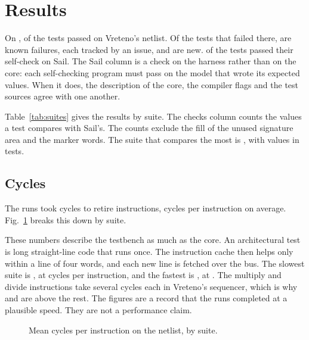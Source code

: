 \section{Results}
\label{sec:results}

On \ReportDate, \NRtlPass{} of the \NTests{} tests passed on Vreteno's
netlist. Of the tests that failed there, \NKnownFail{} are known
failures, each tracked by an issue, and \NUnknownFail{} are new.
\NSailPass{} of the \NTests{} tests passed their self-check on Sail. The
Sail column is a check on the harness rather than on the core: each
self-checking program must pass on the model that wrote its expected
values. When it does, the description of the core, the compiler flags
and the test sources agree with one another.

Table~\ref{tab:suites} gives the results by suite. The checks column
counts the values a test compares with Sail's. The counts exclude the
fill of the unused signature area and the marker words. The suite that
compares the most is \code{\MostChecksSuite}, with \MostChecks{}
values in \MostChecksTests{} tests.

\begin{table}[t]
\centering
\caption{Results by suite}
\label{tab:suites}
\scriptsize

\end{table}

\subsection{Cycles}

The \NTests{} runs took \TotalCycles{} cycles to retire \TotalInstr{}
instructions, \MeanCPI{} cycles per instruction on average.
Fig.~\ref{fig:cpi} breaks this down by suite.

These numbers describe the testbench as much as the core. An
architectural test is long straight-line code that runs once. The
instruction cache then helps only within a line of four words, and
each new line is fetched over the bus. The slowest suite is \code{\SlowSuite}, at \SlowCPI{} cycles
per instruction, and the fastest is \code{\FastSuite}, at \FastCPI.
The multiply and divide instructions take several cycles each in
Vreteno's sequencer, which is why  and  are above
the rest. The figures are a record that the runs completed
at a plausible speed. They are not a performance claim.

\begin{figure}[t]
\centering

\caption{Mean cycles per instruction on the netlist, by suite.}
\label{fig:cpi}
\end{figure}
